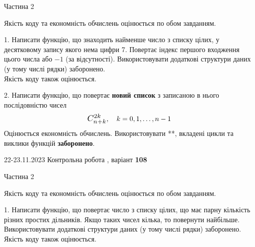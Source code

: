 \documentclass[12pt, ukrainian]{article}
\begin{document}
{{{{{{\begin {Huge}
\begin{center}Частина 2
\end{center}
\vspace{10mm}
\end {Huge}

{
\begin {Large}
Якість коду та економність обчислень оцінюється по обом завданням.

\vspace{5mm}

1. Написати функцію, що знаходить найменше число з списку цілих, у десятковому запису якого нема цифри 7. Повертає індекс першого входження цього числа або $-1$ (за відсутності). Використовувати додаткові структури даних (у тому числі рядки) заборонено.\\	Якість коду також оцінюється. 



\vspace{10mm}



2. 
Написати функцію, що повертає \textbf{новий список} з записаною в нього послідовністю чисел
$$\scalebox{1.2}{$C_{n+k}^{2k}$}, \quad k=0,1,\ldots,n-1$$
Оцінюється економність обчислень. Використовувати **, вкладені цикли та виклики функцій \textbf{заборонено}.

\end{Large}\newpage




\begin {Huge}
{{22-23.11.2023 Контрольна робота , варіант  \No \textbf { 108 }\par}}

\begin{center}Частина 2
\end{center}
\vspace{10mm}
\end {Huge}

{
\begin {Large}
Якість коду та економність обчислень оцінюється по обом завданням.

\vspace{5mm}

1. Написати функцію, що повертає число з списку цілих, що має парну кількість різних простих дільників. Якщо таких чисел кілька, то повернути найбільше. Використовувати додаткові структури даних (у тому числі рядки) заборонено.\\	Якість коду також оцінюється. 




\end{Large}}}}}}}}}
\end{document}
